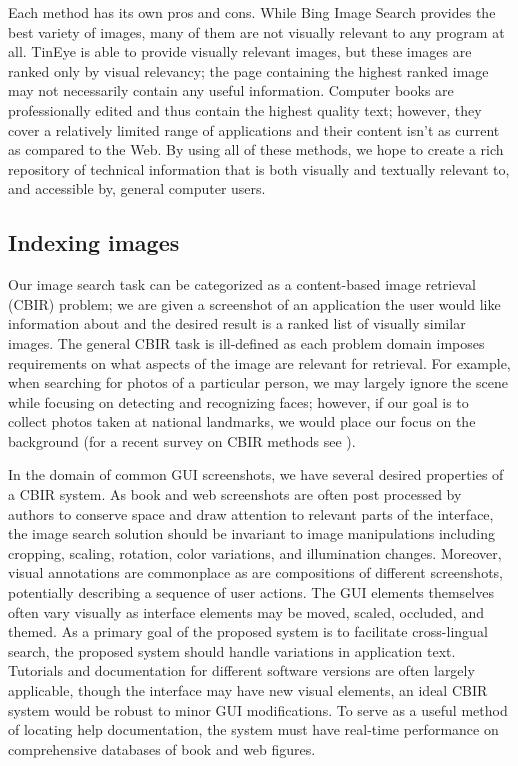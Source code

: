 \documentclass{www2010-submission}
\begin{document}
Each method has its own pros and cons. While Bing Image Search
provides the best variety of images, many of them are not visually
relevant to any program at all. TinEye is able to provide visually
relevant images, but these images are ranked only by visual
relevancy; the page containing the highest ranked image may not
necessarily contain any useful information. Computer books are
professionally edited and thus contain the highest quality
text; however, they cover a relatively limited range of applications
and their content isn't as current as compared to the Web. By
using all of these methods, we hope to create a rich repository of
technical information that is both visually and textually relevant
to, and accessible by, general computer users.
 
\subsection{Indexing images}
Our image search task can be categorized as a content-based image
retrieval (CBIR) problem; we are given a screenshot of an application
the user would like information about and the desired result is a
ranked list of visually similar images.  The general CBIR task is
ill-defined as each problem domain imposes requirements on what
aspects of the image are relevant for retrieval.  For example, when
searching for photos of a particular person, we may largely ignore the
scene while focusing on detecting and recognizing faces; however, if
our goal is to collect photos taken at national landmarks, we
would place our focus on the background (for a recent survey on CBIR
methods see \cite{Datta1348248}).

In the domain of common GUI screenshots, we have several desired
properties of a CBIR system.  As book and web screenshots are often
post processed by authors to conserve space and draw attention to
relevant parts of the interface, the image search solution should be
invariant to image manipulations including cropping, scaling,
rotation, color variations, and illumination changes.  Moreover,
visual annotations are commonplace as are compositions of different
screenshots, potentially describing a sequence of user actions.  The
GUI elements themselves often vary visually as interface elements may
be moved, scaled, occluded, and themed.  As a primary goal of the
proposed system is to facilitate cross-lingual search, the proposed
system should handle variations in application text.  Tutorials and
documentation for different software versions are often largely
applicable, though the interface may have new visual elements, an
ideal CBIR system would be robust to minor GUI modifications.  To
serve as a useful method of locating help documentation, the system
must have real-time performance on comprehensive databases of book and
web figures.
\end{document}
